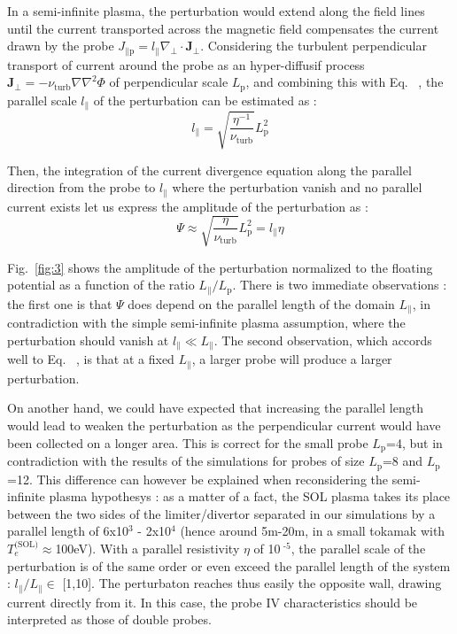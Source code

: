 \documentclass[cpp,a4paper,fleqn,twoside%
]{w-art}
\makeatletter
\renewcommand*{\eqref}[1]{%
  \hyperref[{#1}]{\textup{\tagform@{\ref*{#1}}}}%
}
\makeatother
\begin{document}
In a semi-infinite plasma, the perturbation would extend along the field lines 
until the current transported across the magnetic field compensates the current drawn 
by the probe $J_{\parallel\text{p}}=l_\parallel \nabla_\perp\cdot \mathbf{J}_\perp $. Considering the turbulent perpendicular transport of 
current around the probe as an hyper-diffusif process $\mathbf J_\perp=-\nu_\text{turb}\nabla \nabla^2\Phi$ of perpendicular scale $L_\text{p}$,
 and combining this with Eq.~\eqref{eq_Ohms_law},
the parallel scale $l_\parallel$ of the perturbation can be estimated as :
\begin{equation}
\label{ExtensionPerturbation}
  l_{\parallel}=\sqrt{\frac{\eta^{-1}}{\nu_\text{turb}}}L_\text{p}^2
\end{equation}

Then, the integration of the current divergence equation along the parallel direction from the probe to $l_\parallel$
where the perturbation vanish and no parallel current exists let us express the amplitude of the perturbation
as :
\begin{equation}
\label{AmplitudePerturbation}
  \Psi\approx\sqrt{\frac{\eta}{\nu_\text{turb}}}L_\text{p}^2=
  l_\parallel \eta 
\end{equation}

Fig.~\ref{fig:3} shows the amplitude of the perturbation normalized to 
the floating potential as a function of the ratio 
$L_\parallel/L_\text{p}$. There is two immediate observations : the first 
one is that $\Psi$ does depend on the parallel length of the domain 
$L_\parallel$, in contradiction with the simple semi-infinite plasma 
assumption, where the perturbation should vanish at $l_\parallel \ll 
L_\parallel$. The second observation, which accords well to 
Eq.~\eqref{AmplitudePerturbation}, is that at a fixed $L_\parallel$, a larger 
probe will produce a larger perturbation. 

On another hand, we 
could have expected that increasing the parallel length would lead to weaken 
the perturbation as the perpendicular current would have been collected on a longer 
area. This is correct for the small probe $L_\text{p}$=4, but in 
contradiction with 
the results of the simulations for probes of size $L_\text{p}$=8 and 
$L_\text{p}$=12. This difference can however be explained when reconsidering 
the semi-infinite plasma hypothesys : as a matter of a fact, the SOL 
plasma takes its place between the two sides of the limiter/divertor 
separated in our simulations by a parallel length of 6x10$^3$ - 
2x10$^4$ (hence around 5m-20m, in a small tokamak with 
$T_e^\text{(SOL)}\approx$100eV). With a parallel resistivity $\eta$ of 
10$^{\text{ -5}}$, the parallel scale of the perturbation is of the same order 
or even exceed the parallel length of the system : 
$l_\parallel/L_\parallel\in$ [1,10]. The perturbaton reaches thus 
easily the opposite wall, drawing current directly from it. In this 
case, the probe IV characteristics should be interpreted as those of 
double probes. 
\end{document}
